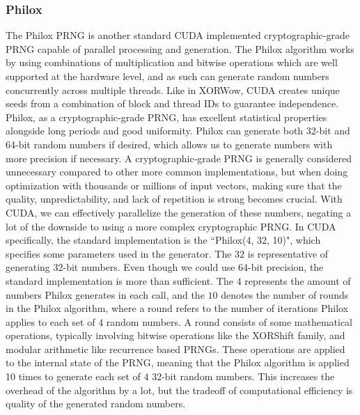 \documentclass{article}
\begin{document}
            \subsubsection{Philox}
The Philox PRNG is another standard CUDA implemented cryptographic-grade PRNG capable of parallel processing and generation. The Philox algorithm works by using combinations of multiplication and bitwise operations which are well supported at the hardware level, and as such can generate random numbers concurrently across multiple threads. Like in XORWow, CUDA creates unique seeds from a combination of block and thread IDs to guarantee independence. Philox, as a cryptographic-grade PRNG, has excellent statistical properties alongside long periods and good uniformity. Philox can generate both 32-bit and 64-bit random numbers if desired, which allows us to generate numbers with more precision if necessary. A cryptographic-grade PRNG is generally considered unnecessary compared to other more common implementations, but when doing optimization with thousands or millions of input vectors, making sure that the quality, unpredictability, and lack of repetition is strong becomes crucial. With CUDA, we can effectively parallelize the generation of these numbers, negating a lot of the downside to using a more complex cryptographic PRNG.  In CUDA specifically, the standard implementation is the ``Philox(4, 32, 10)", which specifies some parameters used in the generator. The $32$ is representative of generating 32-bit numbers. Even though we could use 64-bit precision, the standard implementation is more than sufficient. The $4$ represents the amount of numbers Philox generates in each call, and the $10$ denotes the number of rounds in the Philox algorithm, where a round refers to the number of iterations Philox applies to each set of $4$ random numbers. A round consists of some mathematical operations, typically involving bitwise operations like the XORShift family, and modular arithmetic like recurrence based PRNGs. These operations are applied to the internal state of the PRNG, meaning that the Philox algorithm is applied 10 times to generate each set of $4$ 32-bit random numbers. This increases the overhead of the algorithm by a lot, but the tradeoff of computational efficiency is quality of the generated random numbers.
\end{document}
